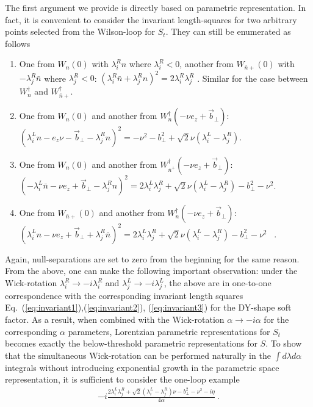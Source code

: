 \documentclass[a4paper,11pt]{article}
\begin{document}
The first argument we provide is directly based on parametric  representation. In fact, it is convenient to consider the invariant length-squares for two arbitrary points selected from the Wilson-loop for $S_t$. They can still be enumerated as follows
\begin{enumerate}
    \item One from $W_n(0)$ with $\lambda_i^R n$ where $\lambda^R_i<0$, another from $W_{\bar n+}(0)$ with $-\lambda^R_j \bar n$ where $\lambda^R_j<0$: $(\lambda^R_i \bar n+\lambda^R_j n)^2=2\lambda^R_i\lambda^R_j$ . Similar for the case between $W_n^{\dagger}$ and $W^{\dagger}_{\bar n+}$.
     \item One from $W_n(0)$ and another from $W^{\dagger}_{n}(-\nu e_z+\vec{b}_\perp)$: $(\lambda^L_i n-e_z\nu-\vec{b}_\perp-\lambda^R_jn)^2=-\nu^2-b_\perp^2+\sqrt{2}\nu(\lambda^L_i-\lambda^R_j)$.
    \item One from $W_n(0)$ and another from $W^{\dagger}_{\bar n^+}(-\nu e_z+\vec{b}_\perp)$: $(-\lambda_i^L \bar n-\nu e_z+\vec{b}_\perp-\lambda^R_jn)^2=2\lambda^L_i\lambda^R_j+\sqrt{2}\nu(\lambda^L_i-\lambda^R_j)-b_\perp^2-\nu^2$.
    \item One from $W_{\bar n+}(0)$ and another from $W_n^{\dagger}(-\nu e_z+\vec{b}_\perp)$: $(\lambda_i^L n-\nu e_z+\vec{b}_\perp+\lambda^R_j \bar n)^2=2\lambda^L_i\lambda^R_j+\sqrt{2}\nu(\lambda^L_i-\lambda^R_j)-b_\perp^2-\nu^2$ \ .
   \end{enumerate}
Again, null-separations are set to zero from the beginning for the same reason. From the above, one can make the following important observation: under the Wick-rotation $\lambda^{R}_i\rightarrow -i\lambda^R_i$ and $\lambda^L_j \rightarrow -i\lambda^L_j$, the above are in one-to-one correspondence with the corresponding invariant length squares Eq.~(\ref{eq:invariant1}),(\ref{eq:invariant2}), (\ref{eq:invariant3}) for the DY-shape soft factor. As a result, when combined with the Wick-rotation $\alpha \rightarrow -i\alpha$ for the corresponding $\alpha$ parameters, Lorentzian parametric representations for $S_t$ becomes exactly the below-threshold parametric representations for $S$. To show that the simultaneous Wick-rotation can be performed naturally in the $\int d\lambda d\alpha$ integrals without introducing exponential growth in the parametric space representation, it is sufficient to consider the one-loop example
\begin{align}
-i\frac{2\lambda^L_i\lambda^R_j+\sqrt{2}(\lambda^L_i-\lambda^R_j)\nu-b_\perp^2-\nu^2-i\eta}{4\alpha} \ .
\end{align}
\end{document}
